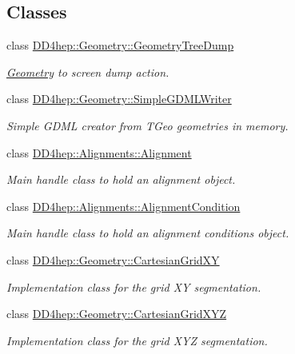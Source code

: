 \subsection*{Classes}
\begin{DoxyCompactItemize}
\item 
class \hyperlink{class_d_d4hep_1_1_geometry_1_1_geometry_tree_dump}{D\+D4hep\+::\+Geometry\+::\+Geometry\+Tree\+Dump}
\begin{DoxyCompactList}\small\item\em \hyperlink{namespace_d_d4hep_1_1_geometry}{Geometry} to screen dump action. \end{DoxyCompactList}\item 
class \hyperlink{class_d_d4hep_1_1_geometry_1_1_simple_g_d_m_l_writer}{D\+D4hep\+::\+Geometry\+::\+Simple\+G\+D\+M\+L\+Writer}
\begin{DoxyCompactList}\small\item\em Simple G\+D\+ML creator from T\+Geo geometries in memory. \end{DoxyCompactList}\item 
class \hyperlink{class_d_d4hep_1_1_alignments_1_1_alignment}{D\+D4hep\+::\+Alignments\+::\+Alignment}
\begin{DoxyCompactList}\small\item\em Main handle class to hold an alignment object. \end{DoxyCompactList}\item 
class \hyperlink{class_d_d4hep_1_1_alignments_1_1_alignment_condition}{D\+D4hep\+::\+Alignments\+::\+Alignment\+Condition}
\begin{DoxyCompactList}\small\item\em Main handle class to hold an alignment conditions object. \end{DoxyCompactList}\item 
class \hyperlink{class_d_d4hep_1_1_geometry_1_1_cartesian_grid_x_y}{D\+D4hep\+::\+Geometry\+::\+Cartesian\+Grid\+XY}
\begin{DoxyCompactList}\small\item\em Implementation class for the grid XY segmentation. \end{DoxyCompactList}\item 
class \hyperlink{class_d_d4hep_1_1_geometry_1_1_cartesian_grid_x_y_z}{D\+D4hep\+::\+Geometry\+::\+Cartesian\+Grid\+X\+YZ}
\begin{DoxyCompactList}\small\item\em Implementation class for the grid X\+YZ segmentation. \end{DoxyCompactList}\item 

\end{DoxyCompactItemize}
